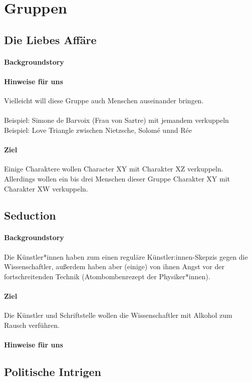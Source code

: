 \documentclass[12pt, a4paper, openany]{report}
\begin{document}
\chapter{Gruppen}
\section{Die Liebes Affäre}
\subsubsection{Backgroundstory}
\subsubsection{Hinweise für uns}
Vielleicht will diese Gruppe auch Menschen auseinander bringen.\\\\
Beispiel: Simone de Barvoix (Frau von Sartre) mit jemandem verkuppeln\\
Beispiel: Love Triangle zwischen Nietzsche, Solomé unnd Rée
\subsubsection{Ziel}
Einige Charaktere wollen Character XY mit Charakter XZ verkuppeln.
Allerdings wollen ein bis drei Menschen dieser Gruppe Charakter XY mit Charakter XW verkuppeln.

\section{Seduction}
\subsubsection {Backgroundstory}
Die Künstler*innen haben zum einen reguläre Künstler:innen-Skepzis gegen die Wissenschaftler, außerdem haben aber (einige) von ihnen Angst vor der fortschreitenden Technik (Atombombenrezept der Physiker*innen).

\subsubsection {Ziel}
Die Künstler und Schriftstelle wollen die Wissenschaftler mit Alkohol zum Rausch verführen.
\subsubsection {Hinweise für uns }

\section{Politische Intrigen}
\end{document}
